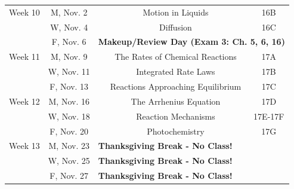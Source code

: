 \documentclass[12pt, letterpaper]{article}
\begin{document}
\begin{tabular}{rcccc}
	\midrule
	Week 10 & M, Nov. 2  &                                                                       & Motion in Liquids                            & 16B     \\
	        & W, Nov. 4  &                                                                       & Diffusion                                    & 16C     \\
	        & F, Nov. 6  & \multicolumn{3}{l}{\textbf{Makeup/Review Day (Exam 3: Ch. 5, 6, 16)}}                                                          \\
	\midrule
	Week 11 & M, Nov. 9  &                                                                       & The Rates of Chemical Reactions              & 17A     \\
	        & W, Nov. 11 &                                                                       & Integrated Rate Laws                         & 17B     \\
	        & F, Nov. 13 &                                                                       & Reactions Approaching Equilibrium            & 17C     \\
	\midrule
	Week 12 & M, Nov. 16 &                                                                       & The Arrhenius Equation                       & 17D     \\
	        & W, Nov. 18 &                                                                       & Reaction Mechanisms                          & 17E-17F \\
	        & F, Nov. 20 &                                                                       & Photochemistry                               & 17G     \\
	\midrule
	Week 13 & M, Nov. 23 & \multicolumn{3}{l}{\textbf{Thanksgiving Break - No Class!}}                                                                    \\
	        & W, Nov. 25 & \multicolumn{3}{l}{\textbf{Thanksgiving Break - No Class!}}                                                                    \\
	        & F, Nov. 27 & \multicolumn{3}{l}{\textbf{Thanksgiving Break - No Class!}}                                                                    \\
\end{tabular}
\end{document}
